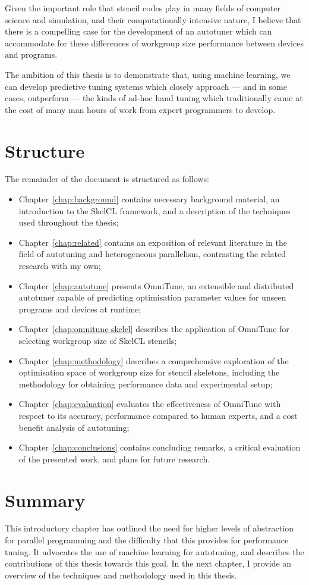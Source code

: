Given the important role that stencil codes play in many fields of
computer science and simulation, and their computationally intensive
nature, I believe that there is a compelling case for the development
of an autotuner which can accommodate for these differences of
workgroup size performance between devices and programs.

The ambition of this thesis is to demonstrate that, using machine
learning, we can develop predictive tuning systems which closely
approach --- and in some cases, outperform --- the kinds of ad-hoc
hand tuning which traditionally came at the cost of many man hours of
work from expert programmers to develop.


\section{Structure}

The remainder of the document is structured as follows:

\begin{itemize}
\item Chapter~\ref{chap:background} contains necessary background
  material, an introduction to the SkelCL framework, and a description
  of the techniques used throughout the thesis;
\item Chapter~\ref{chap:related} contains an exposition of relevant
  literature in the field of autotuning and heterogeneous parallelism,
  contrasting the related research with my own;
\item Chapter~\ref{chap:autotune} presents OmniTune, an extensible and
  distributed autotuner capable of predicting optimisation parameter
  values for unseen programs and devices at runtime;
\item Chapter~\ref{chap:omnitune-skelcl} describes the application of
  OmniTune for selecting workgroup size of SkelCL stencils;
\item Chapter~\ref{chap:methodology} describes a comprehensive
  exploration of the optimisation space of workgroup size for stencil
  skeletons, including the methodology for obtaining performance data
  and experimental setup;
\item Chapter~\ref{chap:evaluation} evaluates the effectiveness of
  OmniTune with respect to its accuracy, performance compared to human
  experts, and a cost benefit analysis of autotuning;
\item Chapter~\ref{chap:conclusions} contains concluding remarks, a
  critical evaluation of the presented work, and plans for future
  research.
\end{itemize}


\section{Summary}

This introductory chapter has outlined the need for higher levels of
abstraction for parallel programming and the difficulty that this
provides for performance tuning. It advocates the use of machine
learning for autotuning, and describes the contributions of this
thesis towards this goal. In the next chapter, I provide an overview
of the techniques and methodology used in this thesis.

